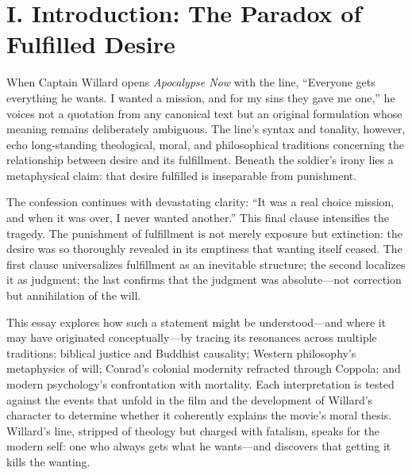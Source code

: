 \section*{I. Introduction: The Paradox of Fulfilled Desire}
\label{sec:i-introduction-the-paradox-of-fulfilled-desire}
When Captain Willard opens \textit{Apocalypse Now} \parencite{CoppolaApocalypse2019} with the
line, ``Everyone gets everything he wants. I wanted a mission, and for my sins they gave me
one,'' he voices not a quotation from any canonical text but an original formulation whose
meaning remains deliberately ambiguous. The line's syntax and
tonality, however, echo long-standing theological, moral, and philosophical traditions
concerning the relationship between desire and its fulfillment. Beneath the soldier's irony
lies a metaphysical claim: that desire fulfilled is inseparable from punishment.

The confession continues with devastating clarity: ``It was a real choice mission, and when it
was over, I never wanted another.'' This final clause intensifies the tragedy. The punishment
of fulfillment is not merely exposure but extinction: the desire was so thoroughly revealed in
its emptiness that wanting itself ceased. The first clause universalizes fulfillment as an
inevitable structure; the second localizes it as judgment; the last confirms that the judgment
was absolute---not correction but annihilation of the will.

This essay explores how such a statement might be understood—and where it may have originated
conceptually—by tracing its resonances across multiple traditions: biblical justice and
Buddhist causality; Western philosophy's metaphysics of will; Conrad's colonial modernity
refracted through Coppola; and modern psychology's confrontation with mortality. Each
interpretation is tested against the events that unfold in the film and the development of
Willard's character to determine whether it coherently explains the movie's moral thesis.
Willard's line, stripped of theology but charged with fatalism, speaks for the modern self:
one who always gets what he wants—and discovers that getting it kills the wanting.
